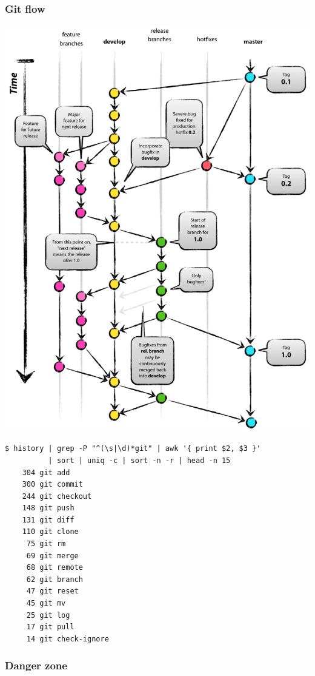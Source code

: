 \documentclass[pdf,russian]{beamer}
\begin{document}
\begin{frame}
    \frametitle{Git flow}
    \pause
    \center
    \includegraphics[height=0.8\textheight]{flow}
\end{frame}

\begin{frame}[fragile]
    \begin{verbatim}
$ history | grep -P "^(\s|\d)*git" | awk '{ print $2, $3 }'
          | sort | uniq -c | sort -n -r | head -n 15
    304 git add
    300 git commit
    244 git checkout
    148 git push
    131 git diff
    110 git clone
     75 git rm
     69 git merge
     68 git remote
     62 git branch
     47 git reset
     45 git mv
     25 git log
     17 git pull
     14 git check-ignore
    \end{verbatim}
\end{frame}

\begin{frame}
    \frametitle{Danger zone}
\end{frame}
\end{document}

